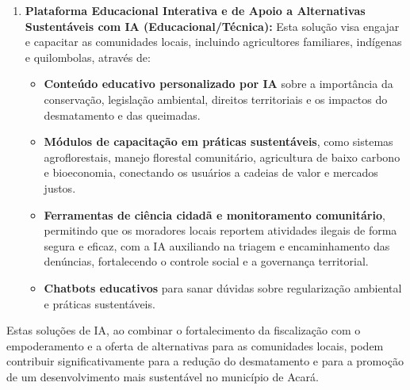 \documentclass[12pt, a4paper, onecolumn, notitlepage]{article}
\begin{document}
\begin{enumerate}
        \item \textbf{Plataforma Educacional Interativa e de Apoio a Alternativas Sustentáveis com IA (Educacional/Técnica):} Esta solução visa engajar e capacitar as comunidades locais, incluindo agricultores familiares, indígenas e quilombolas, através de:
        \begin{itemize}
            \item \textbf{Conteúdo educativo personalizado por IA} sobre a importância da conservação, legislação ambiental, direitos territoriais e os impactos do desmatamento e das queimadas.
            \item \textbf{Módulos de capacitação em práticas sustentáveis}, como sistemas agroflorestais, manejo florestal comunitário, agricultura de baixo carbono e bioeconomia, conectando os usuários a cadeias de valor e mercados justos.
            \item \textbf{Ferramentas de ciência cidadã e monitoramento comunitário}, permitindo que os moradores locais reportem atividades ilegais de forma segura e eficaz, com a IA auxiliando na triagem e encaminhamento das denúncias, fortalecendo o controle social e a governança territorial.
            \item \textbf{Chatbots educativos} para sanar dúvidas sobre regularização ambiental e práticas sustentáveis.
        \end{itemize}
    \end{enumerate}

    Estas soluções de IA, ao combinar o fortalecimento da fiscalização com o empoderamento e a oferta de alternativas para as comunidades locais, podem contribuir significativamente para a redução do desmatamento e para a promoção de um desenvolvimento mais sustentável no município de Acará.
    

    
\end{document}
